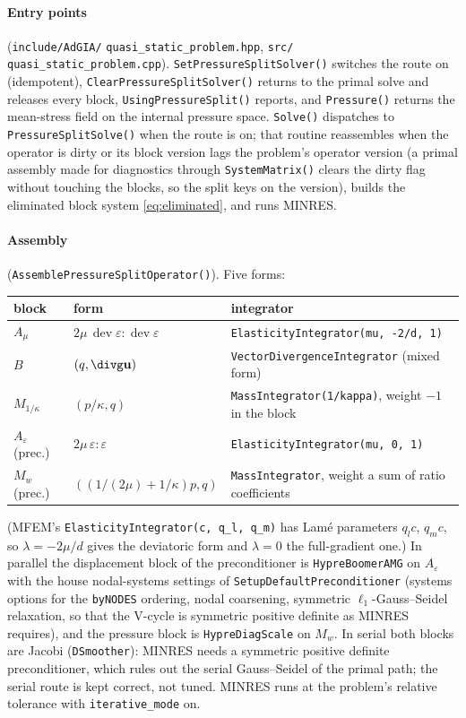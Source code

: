 \documentclass[11pt]{article}
\numberwithin{equation}{section}
\theoremstyle{remark}
\newcommand{\eps}{\varepsilon}
\newcommand{\dev}{\operatorname{dev}}
\newcommand{\vu}{\mathbf{u}}
\newcommand{\Ae}{A_{\eps}}
\newcommand{\Amu}{A_{\mu}}
\newcommand{\Mk}{M_{1/\kappa}}
\newcommand{\Mw}{M_{w}}
\newcommand{\code}[1]{\texttt{#1}}
\begin{document}
\paragraph{Entry points} (\code{include/AdGIA/}\allowbreak
\code{quasi\_static\_problem.hpp}, \code{src/}\allowbreak
\code{quasi\_static\_problem.cpp}).
\code{SetPressureSplitSolver()} switches the route on (idempotent),
\code{ClearPressureSplitSolver()} returns to the primal solve and releases
every block, \code{UsingPressureSplit()} reports, and \code{Pressure()}
returns the mean-stress field on the internal pressure space.
\code{Solve()} dispatches to \code{PressureSplitSolve()} when the route is
on; that routine reassembles when the operator is dirty or its block
version lags the problem's operator version (a primal assembly made for
diagnostics through \code{SystemMatrix()} clears the dirty flag without
touching the blocks, so the split keys on the version), builds the
eliminated block system \eqref{eq:eliminated}, and runs MINRES.

\paragraph{Assembly} (\code{AssemblePressureSplitOperator()}). Five forms:
\begin{center}
\small
\begin{tabular}{@{}lll@{}}
\toprule
block & form & integrator \\
\midrule
$\Amu$ & $2\mu\,\dev\eps:\dev\eps$ & \code{ElasticityIntegrator(mu, -2/d, 1)} \\
$B$ & $(q,\divg\vu)$ & \code{VectorDivergenceIntegrator} (mixed form) \\
$\Mk$ & $(p/\kappa,q)$ & \code{MassIntegrator(1/kappa)}, weight $-1$ in the block \\
$\Ae$ (prec.) & $2\mu\,\eps:\eps$ & \code{ElasticityIntegrator(mu, 0, 1)} \\
$\Mw$ (prec.) & $((1/(2\mu) + 1/\kappa)p,q)$ & \code{MassIntegrator}, weight a sum of ratio coefficients \\
\bottomrule
\end{tabular}
\end{center}
(MFEM's \code{ElasticityIntegrator(c, q\_l, q\_m)} has Lamé parameters
$q_l c$, $q_m c$, so $\lambda = -2\mu/d$ gives the deviatoric form and
$\lambda = 0$ the full-gradient one.) In parallel the displacement block
of the preconditioner is \code{HypreBoomerAMG} on $\Ae$ with the house
nodal-systems settings of \code{SetupDefaultPreconditioner} (systems
options for the \code{byNODES} ordering, nodal coarsening, symmetric
$\ell_1$-Gauss--Seidel relaxation, so that the V-cycle is symmetric
positive definite as MINRES requires), and the pressure block is
\code{HypreDiagScale} on $\Mw$. In serial both blocks are Jacobi
(\code{DSmoother}): MINRES needs a symmetric positive definite
preconditioner, which rules out the serial Gauss--Seidel of the primal
path; the serial route is kept correct, not tuned. MINRES runs at the
problem's relative tolerance with \code{iterative\_mode} on.
\end{document}
